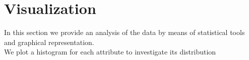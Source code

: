 \chapter*{Visualization}
In this section we provide an analysis of the data by means of statistical tools and graphical representation.\\

We plot a histogram for each attribute to investigate its distribution
